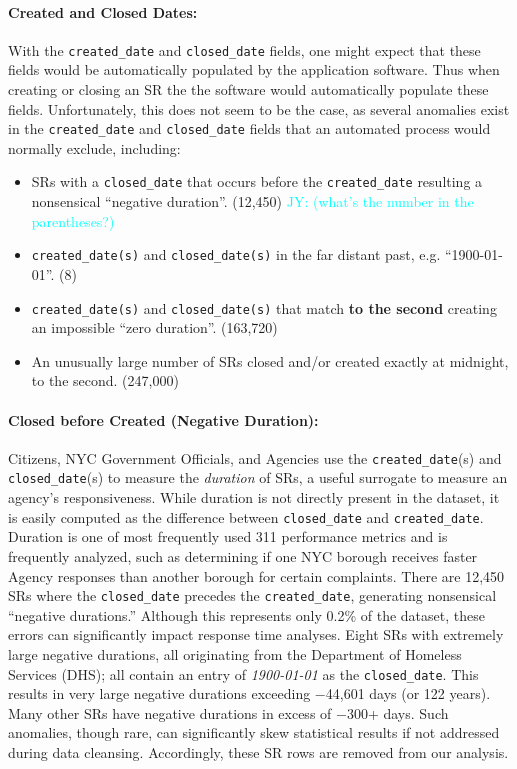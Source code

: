 \documentclass[linenumber]{jdsart}
\newcommand{\jy}[1]{\textcolor{cyan}{JY: (#1)}}
\begin{document}
\paragraph{Created and Closed Dates:}
\label{sec:negativeduration}
With the \texttt{created\_date} and \texttt{closed\_date} fields, one 
might expect that these fields would be automatically populated by the  
application software. Thus when creating  or closing an SR 
the the software would automatically populate these fields. 
Unfortunately, this does not seem to be the case, as several anomalies 
exist in the \texttt{created\_date} and \texttt{closed\_date} fields that
an automated process would normally exclude, including:

\begin{itemize}[left=1.5em]
    \item SRs with a \texttt{closed\_date} that occurs before the 
    \texttt{created\_date} resulting a nonsensical ``negative duration''. (12,450)
\jy{what's the number in the parentheses?}
    \item \texttt{created\_date(s)} and \texttt{closed\_date(s)} in 
    the far distant past, e.g. ``1900-01-01''. (8)
    \item \texttt{created\_date(s)} and \texttt{closed\_date(s)} that 
    match \textbf{to the second} creating an impossible ``zero duration''. (163,720)
    \item An unusually large number of SRs closed and/or created 
    exactly at midnight, to the second. (247,000)
\end{itemize}


\paragraph{Closed before Created (Negative Duration):}
Citizens, NYC Government Officials, and Agencies use the \texttt{created\_date}(s) and 
\texttt{closed\_date}(s) to measure the \textit{duration} of SRs, 
a useful surrogate to measure an agency's responsiveness. 
While duration is not directly present in the dataset, 
it is easily computed as the difference between
\texttt{closed\_date} and \texttt{created\_date}.  Duration is one of 
most frequently used 311 performance metrics 
and is frequently analyzed, such as determining if 
one NYC borough receives faster Agency responses than 
another borough for certain complaints. There are 
12,450 SRs where the \texttt{closed\_date} precedes the 
\texttt{created\_date}, generating nonsensical ``negative durations.'' 
Although this represents only 0.2\% of the dataset, these errors can 
significantly impact response time analyses. Eight SRs with extremely 
large negative durations, all originating from the 
Department of Homeless Services (DHS); all contain an entry 
of \textit{1900-01-01} as the \texttt{closed\_date}. This results 
in very large negative durations exceeding $-$44,601 
days (or 122 years). Many other SRs have negative durations 
in excess of $-$300+ days. Such anomalies, though rare, can 
significantly skew statistical results if not addressed during 
data cleansing. Accordingly, these SR rows are removed from our analysis. 
\end{document}

